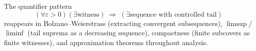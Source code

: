 \begin{remark}
The quantifier pattern
\[
  (\forall\varepsilon>0)(\exists\text{witness})
  \;\Rightarrow\;
  (\exists\text{sequence with controlled tail})
\]
reappears in Bolzano--Weierstrass (extracting convergent subsequences),
$\limsup$/$\liminf$ (tail suprema as a decreasing sequence),
compactness (finite subcovers as finite witnesses), and approximation
theorems throughout analysis.
\end{remark}
